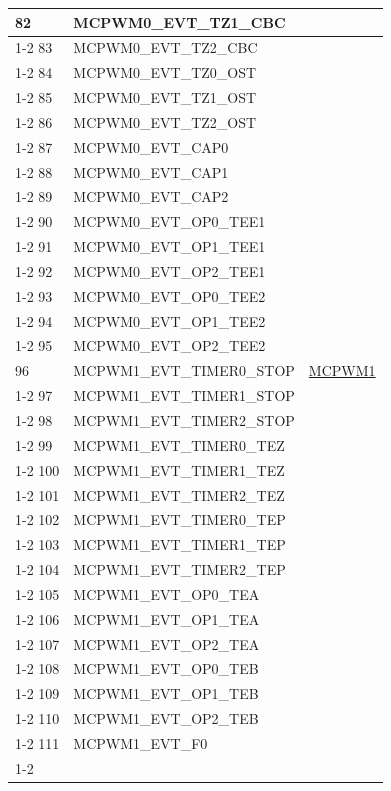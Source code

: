 \documentclass[main\_\_CN.tex]{subfiles}
\begin{document}
\begin{longtable}{ | l | l | l | }
82  & MCPWM0\_EVT\_TZ1\_CBC & \\ \cline{1-2}
83  & MCPWM0\_EVT\_TZ2\_CBC & \\ \cline{1-2}
84  & MCPWM0\_EVT\_TZ0\_OST & \\ \cline{1-2}
85  & MCPWM0\_EVT\_TZ1\_OST & \\ \cline{1-2}
86  & MCPWM0\_EVT\_TZ2\_OST & \\ \cline{1-2}
87  & MCPWM0\_EVT\_CAP0   & \\ \cline{1-2}
88  & MCPWM0\_EVT\_CAP1   & \\ \cline{1-2}
89  & MCPWM0\_EVT\_CAP2   & \\ \cline{1-2}
90  & MCPWM0\_EVT\_OP0\_TEE1   & \\ \cline{1-2}
91  & MCPWM0\_EVT\_OP1\_TEE1   & \\ \cline{1-2}
92  & MCPWM0\_EVT\_OP2\_TEE1   & \\ \cline{1-2}
93  & MCPWM0\_EVT\_OP0\_TEE2   & \\ \cline{1-2}
94  & MCPWM0\_EVT\_OP1\_TEE2   & \\ \cline{1-2}
95  & MCPWM0\_EVT\_OP2\_TEE2   & \\ \hline
96  & MCPWM1\_EVT\_TIMER0\_STOP  & \hyperref[mod:mcpwm]{MCPWM1}\\ \cline{1-2}
97  & MCPWM1\_EVT\_TIMER1\_STOP  & \\ \cline{1-2}
98  & MCPWM1\_EVT\_TIMER2\_STOP  & \\ \cline{1-2}
99  & MCPWM1\_EVT\_TIMER0\_TEZ   & \\ \cline{1-2}
100  & MCPWM1\_EVT\_TIMER1\_TEZ   & \\ \cline{1-2}
101  & MCPWM1\_EVT\_TIMER2\_TEZ   & \\ \cline{1-2}
102  & MCPWM1\_EVT\_TIMER0\_TEP   & \\ \cline{1-2}
103  & MCPWM1\_EVT\_TIMER1\_TEP   & \\ \cline{1-2}
104  & MCPWM1\_EVT\_TIMER2\_TEP   & \\ \cline{1-2}
105  & MCPWM1\_EVT\_OP0\_TEA & \\ \cline{1-2}
106  & MCPWM1\_EVT\_OP1\_TEA & \\ \cline{1-2}
107  & MCPWM1\_EVT\_OP2\_TEA & \\ \cline{1-2}
108  & MCPWM1\_EVT\_OP0\_TEB & \\ \cline{1-2}
109  & MCPWM1\_EVT\_OP1\_TEB & \\ \cline{1-2}
110  & MCPWM1\_EVT\_OP2\_TEB & \\ \cline{1-2}
111  & MCPWM1\_EVT\_F0     & \\ \cline{1-2}

\end{longtable}
\end{document}

